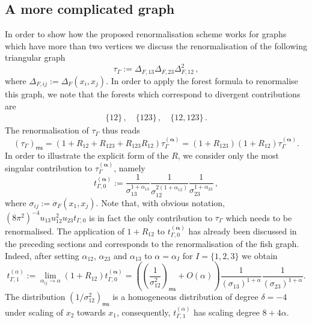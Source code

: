 \documentclass[10pt]{book}
\newcommand{\ms}{\mathsf{ms}}
\theoremstyle{break}
\begin{document}
\subsection{A more complicated graph}

\begin{center}
%
%
\end{center}

In order to show how the proposed renormalisation scheme works for graphs which have more than two vertices we discuss the renormalisation of the following triangular graph
\[
\tau_\Gamma := \Delta_{F,13}\Delta_{F,23}\Delta_{F,12}^2\,,
\]
where $\Delta_{F,ij}:=\Delta_F(x_i,x_j)$. In order to apply the forest formula %
to renormalise this graph, we note that the forests which correspond to divergent contributions are 
\begin{gather*}
\{12\}\,,\quad\{123\}\,,\quad \{12,123\}\,.
\end{gather*} 
The renormalisation of $\tau_\Gamma$ thus reads
\[
(\tau_\Gamma)_\ms = (1+R_{12}+R_{123}+R_{123}R_{12}) \tau^{(\boldsymbol{\alpha})}_\Gamma   =   (1+R_{123})(1+R_{12}) \tau^{(\boldsymbol{\alpha})}_\Gamma.
\]
In order to illustrate the explicit form of the $R$, we consider only the most singular contribution to $\tau^{(\boldsymbol{\alpha})}_\Gamma$, namely
\[
t_{\Gamma,0}^{(\boldsymbol{\alpha})} := \frac{1}{\sigma_{13}^{1+\alpha_{13}}} \frac{1}{\sigma_{12}^{2(1+\alpha_{12})}} \frac{1}{\sigma_{23}^{1+\alpha_{23}}}\,,
\]
where $\sigma_{ij} := \sigma_F(x_1,x_j)$. Note that, with obvious notation, $(8\pi^2)^{-4}u_{13} u^2_{12} u_{23} t_{\Gamma,0}$ is in fact the only contribution to $\tau_\Gamma$ which needs to be renormalised. The application of $1+R_{12}$ to $t_{\Gamma,0}^{(\boldsymbol{\alpha})}$ has already been discussed in the preceding sections and corresponds to the renormalisation of the fish graph. Indeed, after setting $\alpha_{12}$, $\alpha_{23}$ and $\alpha_{13}$ to $\alpha=\alpha_I$ for $I=\{1,2,3\}$ we obtain
\[
t_{\Gamma,1}^{(\alpha)} := \lim_{\alpha_{ij}\to\alpha}(1+R_{12}) t_{\Gamma,0}^{(\boldsymbol{\alpha})}  = \left(\left(\frac{1}{\sigma_{12}^2}\right)_\ms + O(\alpha)\right)
\frac{1}{(\sigma_{13})^{1+\alpha}} \frac{1}{(\sigma_{23})^{1+\alpha}}.
\]
%
The distribution $(1/\sigma^2_{12})_\ms$ is a homogeneous distribution of degree $\delta=-4$ under scaling of $x_2$ towards $x_1$, consequently, $t_{\Gamma,1}^{(\alpha)}$ has scaling degree $8+4\alpha$. 
\end{document}
